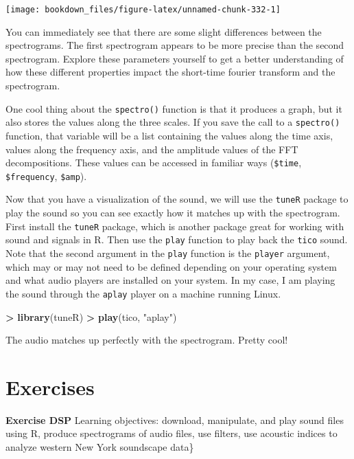\documentclass[
]{krantz}
\makeatletter
\newenvironment{Shaded}{\begin{snugshade}}{\end{snugshade}}
\newcommand{\KeywordTok}[1]{\textcolor[rgb]{0.27,0.27,0.27}{\textbf{#1}}}
\newcommand{\NormalTok}[1]{#1}
\newcommand{\OperatorTok}[1]{\textcolor[rgb]{0.43,0.43,0.43}{\textbf{#1}}}
\newcommand{\StringTok}[1]{\textcolor[rgb]{0.5,0.5,0.5}{#1}}
\newenvironment{kframe}{%
\medskip{}
\setlength{\fboxsep}{.8em}
 \def\at@end@of@kframe{}%
 \ifinner\ifhmode%
  \def\at@end@of@kframe{\end{minipage}}%
  \begin{minipage}{\columnwidth}%
 \fi\fi%
 \def\FrameCommand##1{\hskip\@totalleftmargin \hskip-\fboxsep
 \colorbox{shadecolor}{##1}\hskip-\fboxsep
     \hskip-\linewidth \hskip-\@totalleftmargin \hskip\columnwidth}%
 \MakeFramed {\advance\hsize-\width
   \@totalleftmargin\z@ \linewidth\hsize
   \@setminipage}}%
 {\par\unskip\endMakeFramed%
 \at@end@of@kframe}
\renewenvironment{Shaded}{\begin{kframe}}{\end{kframe}}
\makeatother
\begin{document}
\texttt{[image: bookdown\_files/figure-latex/unnamed-chunk-332-1]}

You can immediately see that there are some slight differences between the spectrograms. The first spectrogram appears to be more precise than the second spectrogram. Explore these parameters yourself to get a better understanding of how these different properties impact the short-time fourier transform and the spectrogram.

One cool thing about the \texttt{spectro()} function is that it produces a graph, but it also stores the values along the three scales. If you save the call to a \texttt{spectro()} function, that variable will be a list containing the values along the time axis, values along the frequency axis, and the amplitude values of the FFT decompositions. These values can be accessed in familiar ways (\texttt{\$time}, \texttt{\$frequency}, \texttt{\$amp}).

Now that you have a visualization of the sound, we will use the \texttt{tuneR} package to play the sound so you can see exactly how it matches up with the spectrogram. First install the \texttt{tuneR} package, which is another package great for working with sound and signals in R. Then use the \texttt{play} function to play back the \texttt{tico} sound. Note that the second argument in the \texttt{play} function is the \texttt{player} argument, which may or may not need to be defined depending on your operating system and what audio players are installed on your system. In my case, I am playing the sound through the \texttt{aplay} player on a machine running Linux.

\begin{Shaded}
\begin{Highlighting}[]
\OperatorTok{\textgreater{}}\StringTok{ }\KeywordTok{library}\NormalTok{(tuneR)}
\OperatorTok{\textgreater{}}\StringTok{ }\KeywordTok{play}\NormalTok{(tico, }\StringTok{"aplay"}\NormalTok{)}
\end{Highlighting}
\end{Shaded}

The audio matches up perfectly with the spectrogram. Pretty cool!

\hypertarget{exercises-11}{%
\section{Exercises}\label{exercises-11}}

\textbf{Exercise DSP} Learning objectives: download, manipulate, and play sound files using R, produce spectrograms of audio files, use filters, use acoustic indices to analyze western New York soundscape data\}
\end{document}
